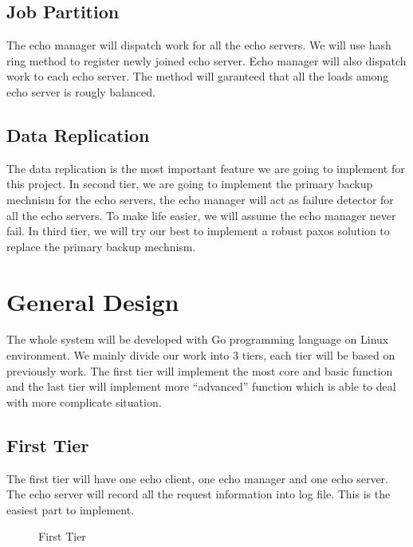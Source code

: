 \documentclass[12pt]{article}
\begin{document}
\subsection{Job Partition}
The echo manager will dispatch work for all the echo servers. We will use hash ring
method to register newly joined echo server. Echo manager will also dispatch work to each echo server. 
The method will garanteed that all the loads among echo server is rougly balanced.

\subsection{Data Replication}
The data replication is the most important feature we are going to implement for this 
project. In second tier, we are going to implement the primary backup mechnism for the
echo servers, the echo manager will act as failure detector for all the echo servers. 
To make life easier, we will assume the echo manager never fail. In third tier, we will
try our best to implement a robust paxos solution to replace the primary backup mechnism. 

\section{General Design}
The whole system will be developed with Go programming language on Linux 
environment. We mainly divide our work into 3 tiers, each tier will be based on 
previously work. The first tier will implement the most core and basic function 
and the last tier will implement more ``advanced'' function which is able to 
deal with more complicate situation.

\subsection{First Tier}
The first tier will have one echo client, one echo manager and one echo server. The
echo server will record all the request information into log file. This is the
easiest part to implement.

\begin{figure}[H]
\caption{First Tier}
\label{fig:speciation}
\end{figure}
\end{document}
